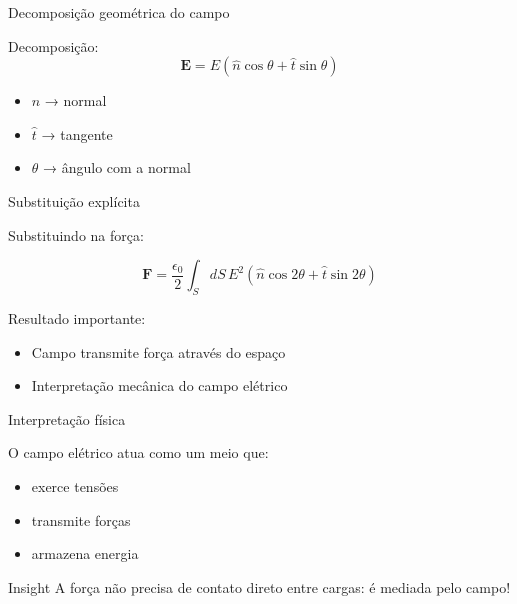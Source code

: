 \documentclass[aspectratio=169,11pt]{beamer}
\begin{document}
\begin{frame}{Decomposição geométrica do campo}

\begin{mybox}
Decomposição:
\[
\mathbf E = E(\hat n \cos\theta + \hat t \sin\theta)
\]
\end{mybox}

\begin{itemize}
\item $\hat n$ → normal
\item $\hat t$ → tangente
\item $\theta$ → ângulo com a normal
\end{itemize}

\end{frame}

\begin{frame}{Substituição explícita}

Substituindo na força:

\begin{eqbox}
\begin{equation}
\mathbf F =
\frac{\epsilon_0}{2}
\int_S dS\, E^2
\left(
\hat n \cos 2\theta + \hat t \sin 2\theta
\right)
\label{eq:3.99}
\end{equation}
\end{eqbox}

\begin{mybox}
Resultado importante:
\begin{itemize}
\item Campo transmite força através do espaço
\item Interpretação mecânica do campo elétrico
\end{itemize}
\end{mybox}

\end{frame}

\begin{frame}{Interpretação física}

\begin{mybox}
O campo elétrico atua como um meio que:
\begin{itemize}
\item exerce tensões
\item transmite forças
\item armazena energia
\end{itemize}
\end{mybox}

\begin{alertblock}{Insight }
A força não precisa de contato direto entre cargas:
é mediada pelo campo!
\end{alertblock}

\end{frame}
\end{document}
